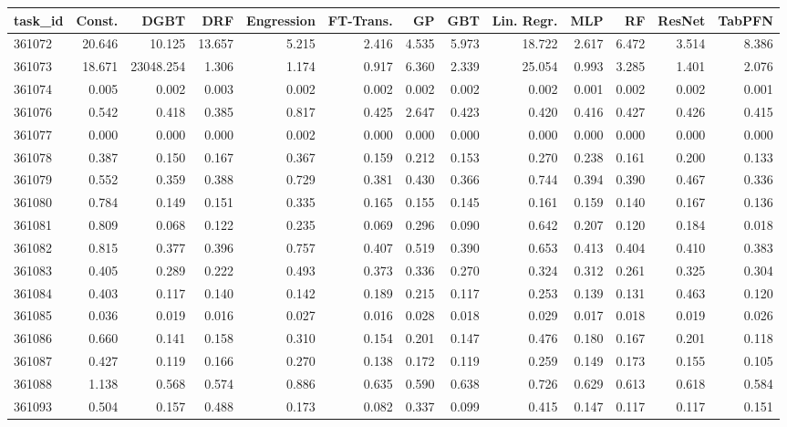 \begin{tabular}{lrrrrrrrrrrrr}
\toprule
task\_id & Const. & DGBT & DRF & Engression & FT-Trans. & GP & GBT & Lin. Regr. & MLP & RF & ResNet & TabPFN \\
\midrule
361072 & 20.646 & 10.125 & 13.657 & 5.215 & 2.416 & 4.535 & 5.973 & 18.722 & 2.617 & 6.472 & 3.514 & 8.386 \\
361073 & 18.671 & 23048.254 & 1.306 & 1.174 & 0.917 & 6.360 & 2.339 & 25.054 & 0.993 & 3.285 & 1.401 & 2.076 \\
361074 & 0.005 & 0.002 & 0.003 & 0.002 & 0.002 & 0.002 & 0.002 & 0.002 & 0.001 & 0.002 & 0.002 & 0.001 \\
361076 & 0.542 & 0.418 & 0.385 & 0.817 & 0.425 & 2.647 & 0.423 & 0.420 & 0.416 & 0.427 & 0.426 & 0.415 \\
361077 & 0.000 & 0.000 & 0.000 & 0.002 & 0.000 & 0.000 & 0.000 & 0.000 & 0.000 & 0.000 & 0.000 & 0.000 \\
361078 & 0.387 & 0.150 & 0.167 & 0.367 & 0.159 & 0.212 & 0.153 & 0.270 & 0.238 & 0.161 & 0.200 & 0.133 \\
361079 & 0.552 & 0.359 & 0.388 & 0.729 & 0.381 & 0.430 & 0.366 & 0.744 & 0.394 & 0.390 & 0.467 & 0.336 \\
361080 & 0.784 & 0.149 & 0.151 & 0.335 & 0.165 & 0.155 & 0.145 & 0.161 & 0.159 & 0.140 & 0.167 & 0.136 \\
361081 & 0.809 & 0.068 & 0.122 & 0.235 & 0.069 & 0.296 & 0.090 & 0.642 & 0.207 & 0.120 & 0.184 & 0.018 \\
361082 & 0.815 & 0.377 & 0.396 & 0.757 & 0.407 & 0.519 & 0.390 & 0.653 & 0.413 & 0.404 & 0.410 & 0.383 \\
361083 & 0.405 & 0.289 & 0.222 & 0.493 & 0.373 & 0.336 & 0.270 & 0.324 & 0.312 & 0.261 & 0.325 & 0.304 \\
361084 & 0.403 & 0.117 & 0.140 & 0.142 & 0.189 & 0.215 & 0.117 & 0.253 & 0.139 & 0.131 & 0.463 & 0.120 \\
361085 & 0.036 & 0.019 & 0.016 & 0.027 & 0.016 & 0.028 & 0.018 & 0.029 & 0.017 & 0.018 & 0.019 & 0.026 \\
361086 & 0.660 & 0.141 & 0.158 & 0.310 & 0.154 & 0.201 & 0.147 & 0.476 & 0.180 & 0.167 & 0.201 & 0.118 \\
361087 & 0.427 & 0.119 & 0.166 & 0.270 & 0.138 & 0.172 & 0.119 & 0.259 & 0.149 & 0.173 & 0.155 & 0.105 \\
361088 & 1.138 & 0.568 & 0.574 & 0.886 & 0.635 & 0.590 & 0.638 & 0.726 & 0.629 & 0.613 & 0.618 & 0.584 \\
361093 & 0.504 & 0.157 & 0.488 & 0.173 & 0.082 & 0.337 & 0.099 & 0.415 & 0.147 & 0.117 & 0.117 & 0.151 \\

\end{tabular}
